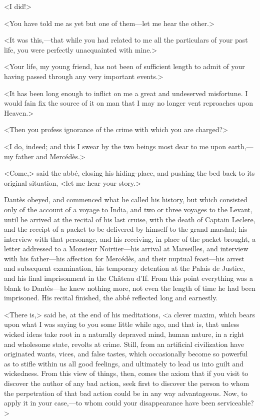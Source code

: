 <I did!> 

 <You have told me as yet but one of them—let me hear the other.> 

 <It was this,—that while you had related to me all the particulars of your past life, you were perfectly unacquainted with mine.> 

 <Your life, my young friend, has not been of sufficient length to admit of your having passed through any very important events.> 

 <It has been long enough to inflict on me a great and undeserved misfortune. I would fain fix the source of it on man that I may no longer vent reproaches upon Heaven.> 

 <Then you profess ignorance of the crime with which you are charged?> 

 <I do, indeed; and this I swear by the two beings most dear to me upon earth,—my father and Mercédès.> 

 <Come,> said the abbé, closing his hiding-place, and pushing the bed back to its original situation, <let me hear your story.> 

 Dantès obeyed, and commenced what he called his history, but which consisted only of the account of a voyage to India, and two or three voyages to the Levant, until he arrived at the recital of his last cruise, with the death of Captain Leclere, and the receipt of a packet to be delivered by himself to the grand marshal; his interview with that personage, and his receiving, in place of the packet brought, a letter addressed to a Monsieur Noirtier—his arrival at Marseilles, and interview with his father—his affection for Mercédès, and their nuptual feast—his arrest and subsequent examination, his temporary detention at the Palais de Justice, and his final imprisonment in the Château d'If. From this point everything was a blank to Dantès—he knew nothing more, not even the length of time he had been imprisoned. His recital finished, the abbé reflected long and earnestly. 

 <There is,> said he, at the end of his meditations, <a clever maxim, which bears upon what I was saying to you some little while ago, and that is, that unless wicked ideas take root in a naturally depraved mind, human nature, in a right and wholesome state, revolts at crime. Still, from an artificial civilization have originated wants, vices, and false tastes, which occasionally become so powerful as to stifle within us all good feelings, and ultimately to lead us into guilt and wickedness. From this view of things, then, comes the axiom that if you visit to discover the author of any bad action, seek first to discover the person to whom the perpetration of that bad action could be in any way advantageous. Now, to apply it in your case,—to whom could your disappearance have been serviceable?> 

